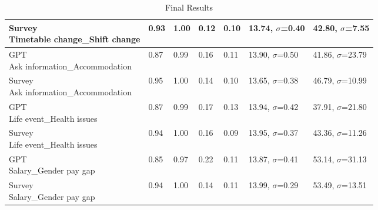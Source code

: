 \begin{table}[h]
{\begin{tabular}{|l|l|l|l|l|l|l|}
    \shortstack[l]{Survey\\Timetable change\_Shift change}                            & 0.93                          & 1.00                         & 0.12                              & 0.10                              & 13.74, $\sigma$=0.40               & 42.80, $\sigma$=7.55           \\ \hline
    \shortstack[l]{GPT\\Ask information\_Accommodation}                               & 0.87                          & 0.99                         & 0.16                              & 0.11                              & 13.90, $\sigma$=0.50               & 41.86, $\sigma$=23.79          \\ \hline
    \shortstack[l]{Survey\\Ask information\_Accommodation}                            & 0.95                          & 1.00                         & 0.14                              & 0.10                              & 13.65, $\sigma$=0.38               & 46.79, $\sigma$=10.99          \\ \hline
    \shortstack[l]{GPT\\Life event\_Health issues}                                    & 0.87                          & 0.99                         & 0.17                              & 0.13                              & 13.94, $\sigma$=0.42               & 37.91, $\sigma$=21.80          \\ \hline
    \shortstack[l]{Survey\\Life event\_Health issues}                                 & 0.94                          & 1.00                         & 0.16                              & 0.09                              & 13.95, $\sigma$=0.37               & 43.36, $\sigma$=11.26          \\ \hline
    \shortstack[l]{GPT\\Salary\_Gender pay gap}                                       & 0.85                          & 0.97                         & 0.22                              & 0.11                              & 13.87, $\sigma$=0.41               & 53.14, $\sigma$=31.13          \\ \hline
    \shortstack[l]{Survey\\Salary\_Gender pay gap}                                    & 0.94                          & 1.00                         & 0.14                              & 0.11                              & 13.99, $\sigma$=0.29               & 53.49, $\sigma$=13.51          \\ \hline
    \end{tabular}}
    \caption{Final Results}\label{table:final_results}
\end{table}



